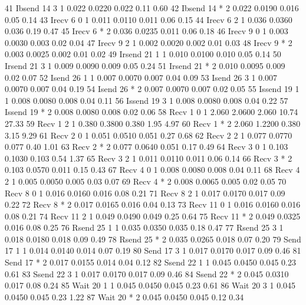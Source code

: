 \begin{Output}
41        Ibsend   14    3     1 0.022 0.0220 0.022  0.11  0.60
42        Ibsend   14    *     2 0.022 0.0190 0.016  0.05  0.14
43         Irecv    6    0     1 0.011 0.0110 0.011  0.06  0.15
44         Irecv    6    2     1 0.036 0.0360 0.036  0.19  0.47
45         Irecv    6    *     2 0.036 0.0235 0.011  0.06  0.18
46         Irecv    9    0     1 0.003 0.0030 0.003  0.02  0.04
47         Irecv    9    2     1 0.002 0.0020 0.002  0.01  0.03
48         Irecv    9    *     2 0.003 0.0025 0.002  0.01  0.02
49        Irsend   21    1     1 0.010 0.0100 0.010  0.05  0.14
50        Irsend   21    3     1 0.009 0.0090 0.009  0.05  0.24
51        Irsend   21    *     2 0.010 0.0095 0.009  0.02  0.07
52         Isend   26    1     1 0.007 0.0070 0.007  0.04  0.09
53         Isend   26    3     1 0.007 0.0070 0.007  0.04  0.19
54         Isend   26    *     2 0.007 0.0070 0.007  0.02  0.05
55        Issend   19    1     1 0.008 0.0080 0.008  0.04  0.11
56        Issend   19    3     1 0.008 0.0080 0.008  0.04  0.22
57        Issend   19    *     2 0.008 0.0080 0.008  0.02  0.06
58          Recv    1    0     1 2.060 2.0600 2.060 10.74 27.33
59          Recv    1    2     1 0.380 0.3800 0.380  1.95  4.97
60          Recv    1    *     2 2.060 1.2200 0.380  3.15  9.29
61          Recv    2    0     1 0.051 0.0510 0.051  0.27  0.68
62          Recv    2    2     1 0.077 0.0770 0.077  0.40  1.01
63          Recv    2    *     2 0.077 0.0640 0.051  0.17  0.49
64          Recv    3    0     1 0.103 0.1030 0.103  0.54  1.37
65          Recv    3    2     1 0.011 0.0110 0.011  0.06  0.14
66          Recv    3    *     2 0.103 0.0570 0.011  0.15  0.43
67          Recv    4    0     1 0.008 0.0080 0.008  0.04  0.11
68          Recv    4    2     1 0.005 0.0050 0.005  0.03  0.07
69          Recv    4    *     2 0.008 0.0065 0.005  0.02  0.05
70          Recv    8    0     1 0.016 0.0160 0.016  0.08  0.21
71          Recv    8    2     1 0.017 0.0170 0.017  0.09  0.22
72          Recv    8    *     2 0.017 0.0165 0.016  0.04  0.13
73          Recv   11    0     1 0.016 0.0160 0.016  0.08  0.21
74          Recv   11    2     1 0.049 0.0490 0.049  0.25  0.64
75          Recv   11    *     2 0.049 0.0325 0.016  0.08  0.25
76         Rsend   25    1     1 0.035 0.0350 0.035  0.18  0.47
77         Rsend   25    3     1 0.018 0.0180 0.018  0.09  0.49
78         Rsend   25    *     2 0.035 0.0265 0.018  0.07  0.20
79          Send   17    1     1 0.014 0.0140 0.014  0.07  0.19
80          Send   17    3     1 0.017 0.0170 0.017  0.09  0.46
81          Send   17    *     2 0.017 0.0155 0.014  0.04  0.12
82         Ssend   22    1     1 0.045 0.0450 0.045  0.23  0.61
83         Ssend   22    3     1 0.017 0.0170 0.017  0.09  0.46
84         Ssend   22    *     2 0.045 0.0310 0.017  0.08  0.24
85          Wait   20    1     1 0.045 0.0450 0.045  0.23  0.61
86          Wait   20    3     1 0.045 0.0450 0.045  0.23  1.22
87          Wait   20    *     2 0.045 0.0450 0.045  0.12  0.34


\end{Output}
